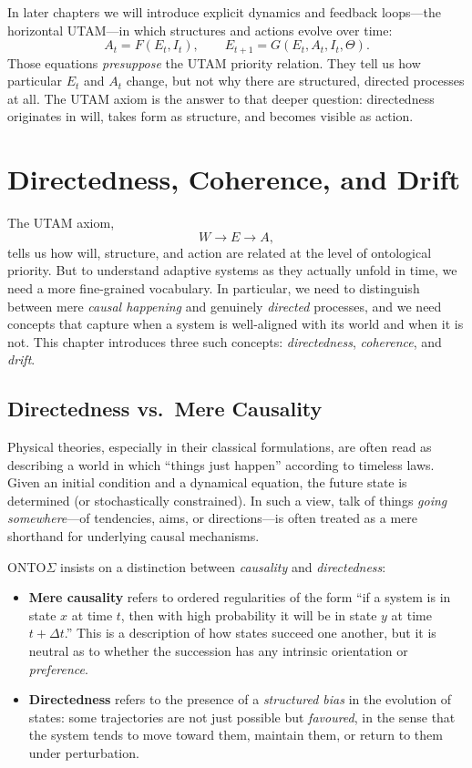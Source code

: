\documentclass[12pt,a4paper]{report}
\newcommand{\Will}{W}
\newcommand{\Struct}{E}
\newcommand{\Act}{A}
\begin{document}
In later chapters we will introduce explicit dynamics and feedback loops---the horizontal UTAM---in which structures and actions evolve over time:
\[
    \Act_t = F(\Struct_t, I_t), \qquad
    \Struct_{t+1} = G(\Struct_t, \Act_t, I_t, \Theta).
\]
Those equations \emph{presuppose} the UTAM priority relation. They tell us how particular \(\Struct_t\) and \(\Act_t\) change, but not why there are structured, directed processes at all. The UTAM axiom is the answer to that deeper question: directedness originates in will, takes form as structure, and becomes visible as action.

\chapter{Directedness, Coherence, and Drift}

The UTAM axiom,
\[
    \Will \to \Struct \to \Act,
\]
tells us how will, structure, and action are related at the level of ontological priority. But to understand adaptive systems as they actually unfold in time, we need a more fine-grained vocabulary. In particular, we need to distinguish between mere \emph{causal happening} and genuinely \emph{directed} processes, and we need concepts that capture when a system is well-aligned with its world and when it is not. This chapter introduces three such concepts: \emph{directedness}, \emph{coherence}, and \emph{drift}.

\section{Directedness vs.\ Mere Causality}

Physical theories, especially in their classical formulations, are often read as describing a world in which ``things just happen'' according to timeless laws. Given an initial condition and a dynamical equation, the future state is determined (or stochastically constrained). In such a view, talk of things \emph{going somewhere}---of tendencies, aims, or directions---is often treated as a mere shorthand for underlying causal mechanisms.

ONTO$\Sigma$ insists on a distinction between \emph{causality} and \emph{directedness}:

\begin{itemize}[leftmargin=2em]
    \item \textbf{Mere causality} refers to ordered regularities of the form ``if a system is in state $x$ at time $t$, then with high probability it will be in state $y$ at time $t + \Delta t$.'' This is a description of how states succeed one another, but it is neutral as to whether the succession has any intrinsic orientation or \emph{preference}.
    \item \textbf{Directedness} refers to the presence of a \emph{structured bias} in the evolution of states: some trajectories are not just possible but \emph{favoured}, in the sense that the system tends to move toward them, maintain them, or return to them under perturbation.
\end{itemize}
\end{document}
